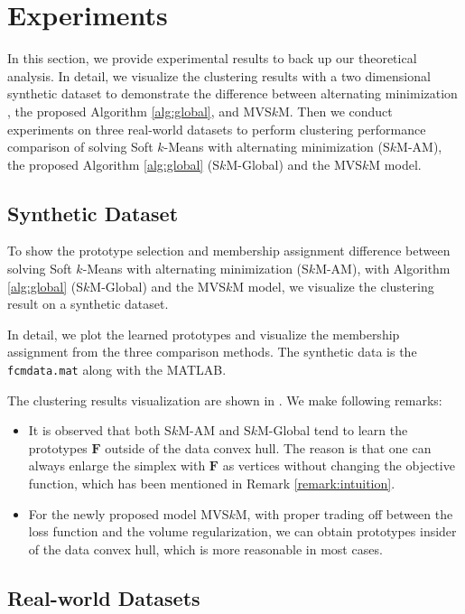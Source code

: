 \documentclass[journal]{IEEEtran}
\begin{document}

\section{Experiments} \label{sec:exps}

In this section, we provide experimental results to back up our theoretical analysis.
In detail, we visualize the clustering results with a two dimensional synthetic dataset to demonstrate the difference between alternating minimization \cite{nascimento2016applying}, the proposed Algorithm \ref{alg:global}, and MVS$k$M.
Then we conduct experiments on three real-world datasets to perform
clustering performance comparison of solving Soft $k$-Means with alternating minimization (S$k$M-AM), the proposed Algorithm \ref{alg:global} (S$k$M-Global) and the MVS$k$M model.

\subsection{Synthetic Dataset}
To show the prototype selection and membership assignment difference between solving Soft $k$-Means with
alternating minimization (S$k$M-AM), with Algorithm \ref{alg:global} (S$k$M-Global) and the MVS$k$M model,
we visualize the clustering result on a synthetic dataset.

In detail, we plot the learned prototypes and visualize the membership assignment from the three comparison methods.
The synthetic data is the \texttt{fcmdata.mat} along with the MATLAB.

The clustering results visualization are shown in .
We make following remarks:
\begin{itemize}
	\item It is observed that both S$k$M-AM and S$k$M-Global tend to learn the prototypes $\mathbf{F}$ outside of the data convex hull. The reason is that one can always enlarge the simplex with $\mathbf{F}$ as vertices without changing the objective function, which has been mentioned in Remark \ref{remark:intuition}.
	\item For the newly proposed model MVS$k$M, with proper trading off between the loss function and the volume regularization, 
	we can obtain prototypes insider of the data convex hull, which is more reasonable in most cases.
\end{itemize}
\subsection{Real-world Datasets}
\end{document}
